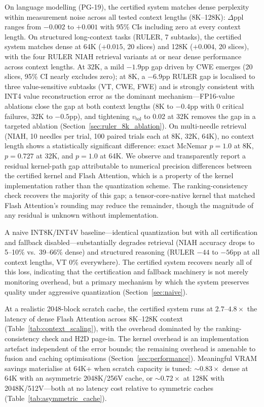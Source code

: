 \documentclass[10pt,twocolumn,a4paper]{article}
\theoremstyle{definition}
\theoremstyle{remark}
\begin{document}
On language modelling (PG-19), the certified system matches dense perplexity within measurement noise across all tested context lengths (8K--128K): $\Delta\mathrm{ppl}$ ranges from $-0.002$ to $+0.001$ with 95\% CIs including zero at every context length.  On structured long-context tasks (RULER, 7 subtasks), the certified system matches dense at 64K ($+0.015$, 20 slices) and 128K ($+0.004$, 20 slices), with the four RULER NIAH retrieval variants at or near dense performance across context lengths.  At 32K, a mild $-1.9$pp gap driven by CWE emerges (20 slices, 95\% CI nearly excludes zero); at 8K, a $-6.9$pp RULER gap is localised to three value-sensitive subtasks (VT, CWE, FWE) and is strongly consistent with INT4 value reconstruction error as the dominant mechanism---FP16-value ablations close the gap at both context lengths (8K to $-0.4$pp with 0 critical failures, 32K to $-0.5$pp), and tightening $v_{\mathrm{tol}}$ to 0.02 at 32K removes the gap in a targeted ablation (Section~\ref{sec:ruler_8k_ablation}).  On multi-needle retrieval (NIAH, 10 needles per trial, 100 paired trials each at 8K, 32K, 64K), no context length shows a statistically significant difference: exact McNemar $p{=}1.0$ at 8K, $p{=}0.727$ at 32K, and $p{=}1.0$ at 64K.  We observe and transparently report a residual kernel-path gap attributable to numerical precision differences between the certified kernel and Flash Attention, which is a property of the kernel implementation rather than the quantization scheme.  The ranking-consistency check recovers the majority of this gap; a tensor-core-native kernel that matched Flash Attention's rounding may reduce the remainder, though the magnitude of any residual is unknown without implementation.

A naive INT8K/INT4V baseline---identical quantization but with all certification and fallback disabled---substantially degrades retrieval (NIAH accuracy drops to 5--10\% vs.\ 39--66\% dense) and structured reasoning (RULER $-44$ to $-56$pp at all context lengths, VT 0\% everywhere).  The certified system recovers nearly all of this loss, indicating that the certification and fallback machinery is not merely monitoring overhead, but a primary mechanism by which the system preserves quality under aggressive quantization (Section~\ref{sec:naive}).

At a realistic 2048-block scratch cache, the certified system runs at $2.7\text{--}4.8\times$ the latency of dense Flash Attention across 8K--128K context (Table~\ref{tab:context_scaling}), with the overhead dominated by the ranking-consistency check and H2D page-in.  The kernel overhead is an implementation artefact independent of the error bounds; the remaining overhead is amenable to fusion and caching optimisations (Section~\ref{sec:performance}).  Meaningful VRAM savings materialise at 64K+ when scratch capacity is tuned: ${\sim}0.83\times$ dense at 64K with an asymmetric 2048K/256V cache, or ${\sim}0.72\times$ at 128K with 2048K/512V---both at no latency cost relative to symmetric caches (Table~\ref{tab:asymmetric_cache}).
\end{document}
